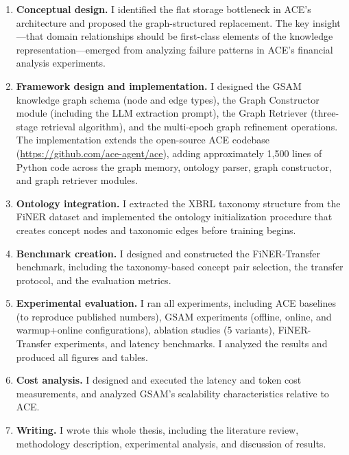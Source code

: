 \documentclass[12pt,a4paper,oneside]{article}
\begin{document}
\begin{enumerate}
\item \textbf{Conceptual design.} I identified the flat storage bottleneck in ACE's architecture and proposed the graph-structured replacement. The key insight---that domain relationships should be first-class elements of the knowledge representation---emerged from analyzing failure patterns in ACE's financial analysis experiments.

\item \textbf{Framework design and implementation.} I designed the GSAM knowledge graph schema (node and edge types), the Graph Constructor module (including the LLM extraction prompt), the Graph Retriever (three-stage retrieval algorithm), and the multi-epoch graph refinement operations. The implementation extends the open-source ACE codebase (\url{https://github.com/ace-agent/ace}), adding approximately 1,500 lines of Python code across the graph memory, ontology parser, graph constructor, and graph retriever modules.

\item \textbf{Ontology integration.} I extracted the XBRL taxonomy structure from the FiNER dataset and implemented the ontology initialization procedure that creates concept nodes and taxonomic edges before training begins.

\item \textbf{Benchmark creation.} I designed and constructed the FiNER-Transfer benchmark, including the taxonomy-based concept pair selection, the transfer protocol, and the evaluation metrics.

\item \textbf{Experimental evaluation.} I ran all experiments, including ACE baselines (to reproduce published numbers), GSAM experiments (offline, online, and warmup+online configurations), ablation studies (5 variants), FiNER-Transfer experiments, and latency benchmarks. I analyzed the results and produced all figures and tables.

\item \textbf{Cost analysis.} I designed and executed the latency and token cost measurements, and analyzed GSAM's scalability characteristics relative to ACE.

\item \textbf{Writing.} I wrote this whole thesis, including the literature review, methodology description, experimental analysis, and discussion of results.
\end{enumerate}
\end{document}
